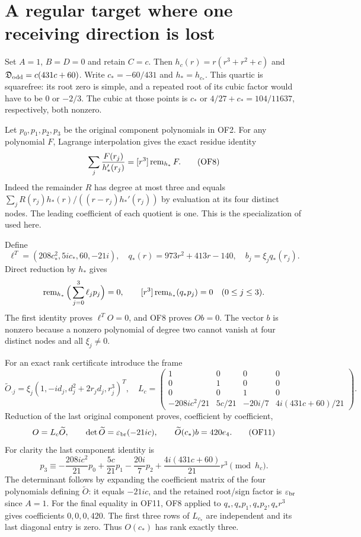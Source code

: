 \section{A regular target where one receiving direction is lost}
Set $A=1$, $B=D=0$ and retain $C=c$. Then
$h_c(r)=r(r^3+r^2+c)$ and $\mathfrak D_{\rm odd}=c(431c+60)$.
Write $c_*=-60/431$ and $h_*=h_{c_*}$. This quartic is squarefree:
its root zero is simple, and a repeated root of its cubic factor
would have to be $0$ or $-2/3$. The cubic at those points is $c_*$
or $4/27+c_*=104/11637$, respectively, both nonzero.

Let $p_0,p_1,p_2,p_3$ be the original component polynomials in OF2.
For any polynomial $F$, Lagrange interpolation gives the exact
residue identity
\begin{equation}
 \sum_j\frac{F(r_j)}{h_*'(r_j)}=[r^3]\operatorname{rem}_{h_*}F.\tag{OF8}
\end{equation}
Indeed the remainder $R$ has degree at most three and equals
$\sum_jR(r_j)h_*(r)/((r-r_j)h_*'(r_j))$ by evaluation at its four
distinct nodes. The leading coefficient of each quotient is one.
This is the specialization of \cite[3.3.1--3.3.3\_1]{sfrepair:Temme} used here.

Define
\begin{equation}
 \ell^T=(208c_*^2,5ic_*,60,-21i),\quad
 q_*(r)=973r^2+413r-140,\quad b_j=\xi_jq_*(r_j).
 \tag{OF9}
\end{equation}
Direct reduction by $h_*$ gives
\[
 \operatorname{rem}_{h_*}\Big(\sum_{j=0}^3\ell_jp_j\Big)=0,
 \qquad [r^3]\operatorname{rem}_{h_*}(q_*p_j)=0\quad(0\le j\le3).
\]
The first identity proves $\ell^TO=0$, and OF8 proves $Ob=0$.
The vector $b$ is nonzero because a nonzero polynomial of degree two
cannot vanish at four distinct nodes and all $\xi_j\ne0$.

For an exact rank certificate introduce the frame
\begin{equation}
 \widetilde O_{\cdot j}=\xi_j(1,-id_j,d_j^2+2r_jd_j,r_j^3)^T,
 \quad
 L_c=\begin{pmatrix}
 1&0&0&0\\0&1&0&0\\0&0&1&0\\
 -208ic^2/21&5c/21&-20i/7&4i(431c+60)/21
 \end{pmatrix}.\tag{OF10}
\end{equation}
Reduction of the last original component proves, coefficient by
coefficient,
\begin{equation}
 O=L_c\widetilde O,\qquad
 \det\widetilde O=\varepsilon_{\rm br}(-21ic),\qquad
 \widetilde O(c_*)b=420e_4.\tag{OF11}
\end{equation}
For clarity the last component identity is
\[
 p_3\equiv-\frac{208ic^2}{21}p_0+\frac{5c}{21}p_1
 -\frac{20i}{7}p_2+\frac{4i(431c+60)}{21}r^3\pmod{h_c}.
\]
The determinant follows by expanding the coefficient matrix of the
four polynomials defining $\widetilde O$: it equals $-21ic$, and
the retained root/sign factor is $\varepsilon_{\rm br}$ since $A=1$.
For the final equality in OF11, OF8 applied to
$q_*,q_*p_1,q_*p_2,q_*r^3$ gives coefficients $0,0,0,420$.
The first three rows of $L_{c_*}$ are independent and its last
diagonal entry is zero. Thus $O(c_*)$ has rank exactly three.

